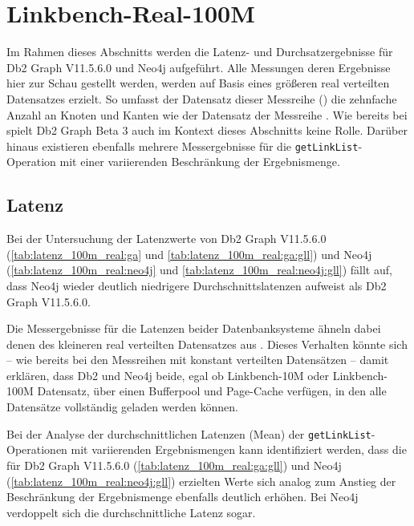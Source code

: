 \section{Linkbench-Real-100M}
\label{ergebnisse:100m_real}
Im Rahmen dieses Abschnitts werden die Latenz- und Durchsatzergebnisse für Db2 Graph V11.5.6.0 und Neo4j aufgeführt. Alle Messungen deren Ergebnisse hier zur Schau gestellt werden, werden auf Basis eines größeren real verteilten Datensatzes erzielt. So umfasst der Datensatz dieser Messreihe () die zehnfache Anzahl an Knoten und Kanten wie der Datensatz der Messreihe . Wie bereits bei  spielt Db2 Graph Beta 3 auch im Kontext dieses Abschnitts keine Rolle. Darüber hinaus existieren ebenfalls mehrere Messergebnisse für die \texttt{getLinkList}-Ope\-ra\-ti\-on mit einer variierenden Beschränkung der Ergebnismenge.

\subsection{Latenz}
Bei der Untersuchung der Latenzwerte von Db2 Graph V11.5.6.0 (\autoref{tab:latenz_100m_real:ga} und \ref{tab:latenz_100m_real:ga:gll}) und Neo4j (\autoref{tab:latenz_100m_real:neo4j} und \ref{tab:latenz_100m_real:neo4j:gll}) fällt auf, dass Neo4j wieder deutlich niedrigere Durchschnittslatenzen aufweist als Db2 Graph V11.5.6.0. 

Die Messergebnisse für die Latenzen beider Datenbanksysteme ähneln dabei denen des kleineren real verteilten Datensatzes aus . Dieses Verhalten könnte sich -- wie bereits bei den Messreihen mit konstant verteilten Datensätzen -- damit erklären, dass Db2 und Neo4j beide, egal ob Linkbench-10M oder Linkbench-100M Datensatz, über einen Bufferpool und Page-Cache verfügen, in den alle Datensätze vollständig geladen werden können.

Bei der Analyse der durchschnittlichen Latenzen (Mean) der \texttt{getLinkList}-Ope\-ra\-ti\-on\-en mit variierenden Ergebnismengen kann identifiziert werden, dass die für Db2 Graph V11.5.6.0 (\autoref{tab:latenz_100m_real:ga:gll}) und Neo4j (\autoref{tab:latenz_100m_real:neo4j:gll}) erzielten Werte sich analog zum Anstieg der Beschränkung der Ergebnismenge ebenfalls deutlich erhöhen. Bei Neo4j verdoppelt sich die durchschnittliche Latenz sogar. 

